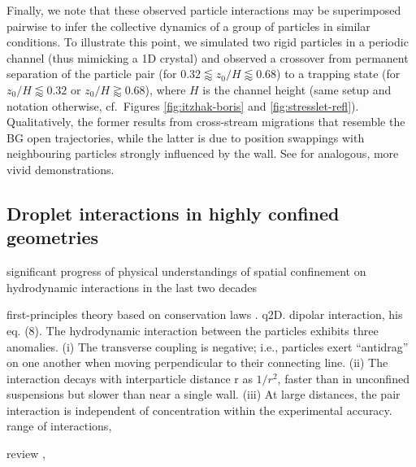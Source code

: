 Finally, we note that these observed particle interactions may be superimposed pairwise to infer the collective dynamics of a group of particles in similar conditions.
To illustrate this point, we simulated two rigid particles in a periodic channel (thus mimicking a 1D crystal) and observed a crossover from permanent separation of the particle pair (for $0.32 \lessapprox z_0/H \lessapprox 0.68$) to a trapping state (for $z_0/H \lessapprox 0.32$ or $z_0/H \gtrapprox 0.68$), where $H$ is the channel height (same setup and notation otherwise, cf.\ Figures \ref{fig:itzhak-boris} and \ref{fig:stresslet-refl}).
Qualitatively, the former results from cross-stream migrations that resemble the BG open trajectories, while the latter is due to position swappings with neighbouring particles strongly influenced by the wall.
See \cite{Beatus2006, Janssen2012, Uspal2013} for analogous, more vivid demonstrations.



\subsection{Droplet interactions in highly confined geometries}
\label{subsec:drop-confined}

significant progress of physical understandings of spatial confinement on hydrodynamic interactions in the last two decades \citep{Cui_etal_2002, Cui2004, Diamant_2005, Davit_2008}

first-principles theory based on conservation laws \citep{Diamant}.
q2D.
dipolar interaction, his eq. (8).
The hydrodynamic interaction between the particles exhibits three anomalies. (i) The transverse coupling is negative; i.e., particles exert ``antidrag'' on one another when moving perpendicular to their connecting line. (ii) The interaction decays with interparticle distance r as $1/r^2$, faster than in unconfined suspensions but slower than near a single wall. (iii) At large distances, the pair interaction is independent of concentration within the experimental accuracy. 
range of interactions,

review \citep{q2d_Beatus},

